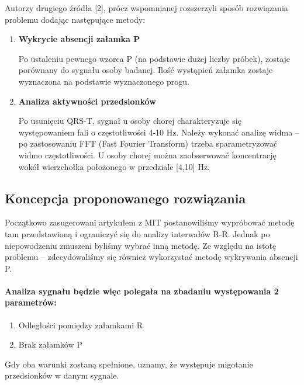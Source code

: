 Autorzy drugiego źródła [2], prócz wspomnianej rozszerzyli sposób rozwiązania problemu dodając następujące metody:
\begin{enumerate}
 \item \textbf{Wykrycie absencji załamka P}
 
    Po ustaleniu pewnego wzorca  P (na podstawie dużej liczby próbek), 
    zostaje porównany do sygnału osoby badanej. 
    Ilość wystąpień załamka zostaje wyznaczona na podstawie wyznaczonego progu.
 \item \textbf{Analiza aktywności przedsionków}
 
    Po usunięciu QRS-T, sygnał u osoby chorej charakteryzuje się występowaniem fali o częstotliwości 4-10 Hz. 
    Należy wykonać analizę widma -- po zastosowaniu FFT (Fast Fourier Transform) 
    trzeba sparametryzować widmo częstotliwości.  
    U osoby chorej można zaobserwować koncentrację wokół wierzchołka położonego w przedziale [4,10] Hz.
\end{enumerate}

\subsection{Koncepcja proponowanego rozwiązania}
Początkowo zasugerowani artykułem z MIT postanowiliśmy wypróbować metodę tam przedstawioną 
i ograniczyć się do analizy interwałów R-R. 
Jednak po niepowodzeniu zmuszeni byliśmy wybrać inną metodę. 
Ze względu na istotę problemu -- zdecydowaliśmy się również wykorzystać metodę wykrywania absencji P.
\paragraph{Analiza sygnału będzie więc polegała na zbadaniu występowania 2 parametrów:}
\begin{enumerate}
    \item Odległości pomiędzy załamkami R
    \item Brak załamków P
\end{enumerate}
Gdy oba warunki zostaną spełnione, uznamy, że występuje migotanie przedsionków w danym sygnale.

